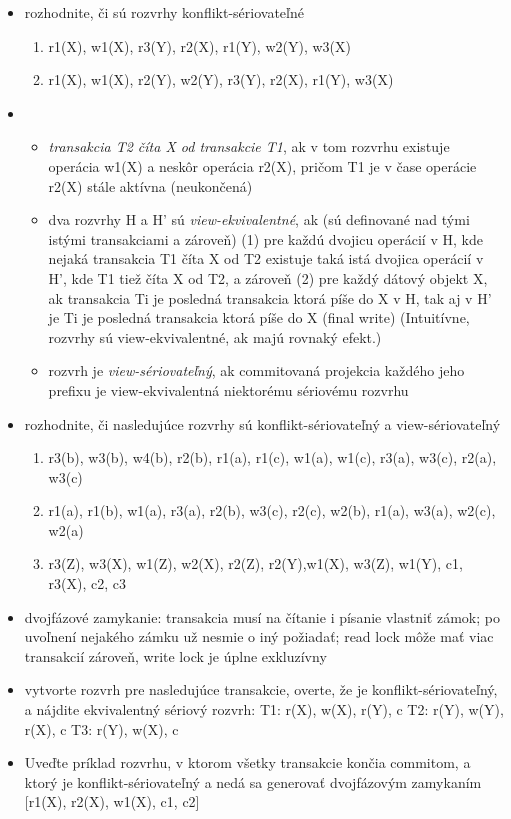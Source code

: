 \documentclass[10pt, a4paper]{article}
\begin{document}
\begin{itemize}
\item rozhodnite, či sú rozvrhy konflikt-sériovateľné
\begin{enumerate}
    \item r1(X), w1(X), r3(Y), r2(X), r1(Y), w2(Y), w3(X)
    \item r1(X), w1(X), r2(Y), w2(Y), r3(Y), r2(X), r1(Y), w3(X)
\end{enumerate}


\item 
\begin{itemize}
\item \emph{transakcia T2 číta X od
transakcie T1}, ak v tom rozvrhu existuje operácia w1(X) a neskôr
operácia r2(X), pričom T1 je v čase operácie r2(X) stále aktívna
(neukončená)

\item
dva rozvrhy H a H' sú \emph{view-ekvivalentné}, ak (sú
definované nad tými istými transakciami a zároveň)
(1) pre každú dvojicu operácií v H, kde nejaká transakcia T1 číta X
od T2 existuje taká istá dvojica operácií v H', kde T1
tiež číta X od
T2, a zároveň
(2) pre každý dátový objekt X, ak transakcia Ti
je posledná
transakcia ktorá píše do X v H, tak aj v H' je Ti
je posledná
transakcia ktorá píše do X (final write)
(Intuitívne, rozvrhy sú view-ekvivalentné, ak majú rovnaký efekt.)

\item rozvrh je \emph{view-sériovateľný}, ak commitovaná projekcia
každého jeho prefixu je view-ekvivalentná niektorému
sériovému rozvrhu
\end{itemize}

\item  rozhodnite, či nasledujúce rozvrhy sú konflikt-sériovateľný a view-sériovateľný
\begin{enumerate}
    \item r3(b), w3(b), w4(b), r2(b), r1(a), r1(c), w1(a), w1(c), r3(a), w3(c), r2(a), w3(c)
    \item r1(a), r1(b), w1(a), r3(a), r2(b), w3(c), r2(c), w2(b), r1(a), w3(a), w2(c), w2(a)
    \item r3(Z), w3(X), w1(Z), w2(X), r2(Z), r2(Y),w1(X), w3(Z), w1(Y), c1, r3(X), c2, c3 
\end{enumerate}

\item dvojfázové zamykanie: transakcia musí na čítanie i písanie vlastniť zámok; po uvoľnení nejakého zámku už nesmie o iný požiadať; read lock môže mať viac transakcií zároveň, write lock je úplne exkluzívny

\item vytvorte rozvrh pre nasledujúce transakcie, overte, že je konflikt-sériovateľný, a nájdite ekvivalentný sériový rozvrh:
T1: r(X), w(X), r(Y), c
T2: r(Y), w(Y), r(X), c
T3: r(Y), w(X), c

\item 
Uveďte príklad rozvrhu, v ktorom všetky transakcie končia commitom, a ktorý
je konflikt-sériovateľný a nedá sa generovať dvojfázovým zamykaním [r1(X), r2(X), w1(X), c1, c2]


\end{itemize}
\end{document}
